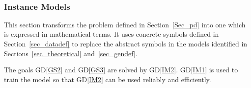 \documentclass[12pt]{article}
\newcommand{\dref}[1]{GD\ref{#1}}
\begin{document}
~\newline
\subsubsection{Instance Models} \label{sec_instance}    

This section transforms the problem defined in Section~\ref{Sec_pd} into 
one which is expressed in mathematical terms. It uses concrete symbols defined 
in Section~\ref{sec_datadef} to replace the abstract symbols in the models 
identified in Sections~\ref{sec_theoretical} and~\ref{sec_gendef}.

The goals \dref{GS2} and \dref{GS3} are solved by \dref{IM2}. \dref{IM1} is used 
to train the model so that \dref{IM2} can be used reliably and efficiently.

~\newline

\end{document}
